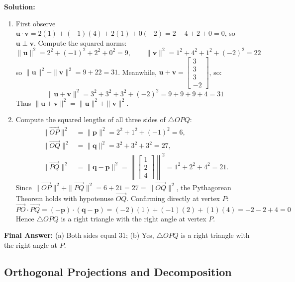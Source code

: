 \documentclass[11pt, letterpaper]{article}
\theoremstyle{definition}
\theoremstyle{remark}
\begin{document}
\textbf{Solution:}
\begin{enumerate}[label=(\alph*)]
    \item First observe $\mathbf{u} \cdot \mathbf{v} = 2(1) + (-1)(4) + 2(1) + 0(-2) = 2 - 4 + 2 + 0 = 0$, so $\mathbf {u} \perp \mathbf{v}$. Compute the squared norms:
    \[
    \|\mathbf{u}\|^2 = 2^2 + (-1)^2 + 2^2 + 0^2 = 9, \qquad \|\mathbf{v}\|^2 = 1^2 + 4^2 + 1^2 + (-2)^2 = 22
    \]
    so $\|\mathbf{u}\|^2 + \|\mathbf{v}\|^2 = 9 + 22 = 31$. Meanwhile, $\mathbf{u} + \mathbf{v} = \begin{bmatrix} 3 \\ 3 \\ 3 \\ -2 \end{bmatrix}$, so:
    \[
    \|\mathbf{u} + \mathbf{v}\|^2 = 3^2 + 3^2 + 3^2 + (-2)^2 = 9 + 9 + 9 + 4 = 31
    \]
    Thus $\|\mathbf{u} + \mathbf{v}\|^2 = \|\mathbf{u}\|^2 + \|\mathbf{v}\|^2$.
    \item Compute the squared lengths of all three sides of $\triangle OPQ$:
    \begin{align*}
    \|\overrightarrow{OP}\|^2 &= \|\mathbf{p}\|^2 = 2^2 + 1^2 + (-1)^2 = 6, \\
    \|\overrightarrow{OQ}\|^2 &= \|\mathbf{q}\|^2 = 3^2 + 3^2 + 3^2 = 27, \\
    \|\overrightarrow{PQ}\|^2 &= \|\mathbf{q} - \mathbf{p}\|^2 = \left\| \begin{bmatrix} 1 \\ 2 \\ 4 \end{bmatrix} \right\|^2 = 1^2 + 2^2 + 4^2 = 21.
    \end{align*}
    Since $\|\overrightarrow{OP}\|^2 + \|\overrightarrow{PQ}\|^2 = 6 + 21 = 27 = \|\overrightarrow{OQ}\|^2$, the Pythagorean Theorem holds with hypotenuse $\overrightarrow{OQ}$. Confirming directly at vertex $P$:
    \[
    \overrightarrow{PO} \cdot \overrightarrow{PQ} = (-\mathbf{p}) \cdot (\mathbf{q} - \mathbf{p}) = (-2)(1) + (-1)(2) + (1)(4) = -2 - 2 + 4 = 0
    \]
    Hence $\triangle OPQ$ is a right triangle with the right angle at vertex $P$.
\end{enumerate}
\textbf{Final Answer:} (a) Both sides equal $31$; (b) Yes, $\triangle OPQ$ is a right triangle with the right angle at $P$.

\subsection{Orthogonal Projections and Decomposition}
\end{document}
